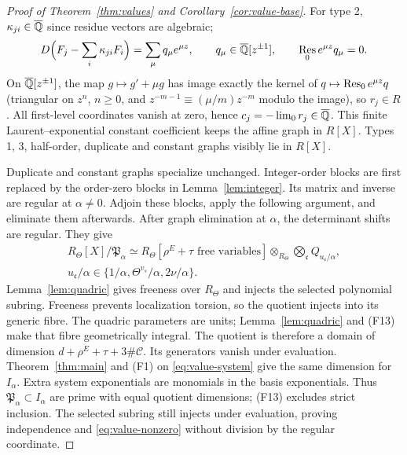 \begin{proof}[Proof of Theorem~\ref{thm:values} and Corollary~\ref{cor:value-base}]
For type 2, $\kappa_{ji}\in{\overline{\mathbb{Q}}}$ since residue vectors are algebraic;
\[
 D\Bigl(F_j-\sum_i\kappa_{ji}F_i\Bigr)
   =\sum_\mu q_\mu e^{\mu z},\qquad
 q_\mu\in{\overline{\mathbb{Q}}}[z^{\pm1}],\qquad
 \operatorname*{Res}_0 e^{\mu z}q_\mu=0.
\]
On ${\overline{\mathbb{Q}}}[z^{\pm1}]$, the map $g\mapsto g'+\mu g$ has image exactly
the kernel of $q\mapsto\operatorname*{Res}_0e^{\mu z}q$ (triangular on $z^n$, $n\ge0$,
and $z^{-m-1}\equiv(\mu/m)z^{-m}$ modulo the image), so $r_j\in R$.
All first-level coordinates vanish at zero, hence
$c_j=-\lim_0r_j\in{\overline{\mathbb{Q}}}$.
This finite Laurent--exponential constant coefficient keeps the affine graph in $R[X]$.
Types 1, 3, half-order, duplicate and constant graphs visibly lie in $R[X]$.

Duplicate and constant graphs specialize unchanged. Integer-order blocks
are first replaced by the order-zero blocks in Lemma~\ref{lem:integer}. Its matrix and inverse are regular at $\alpha\ne0$. Adjoin these blocks,
apply the following argument, and eliminate them afterwards.
After graph elimination at $\alpha$, the determinant shifts are regular.
They give
\begin{equation}\label{eq:specialized-quadric}
\begin{gathered}
R_\Theta[X]/\mathfrak P_\alpha\simeq
R_\Theta[\rho^E+\tau\text{ free variables}]\otimes_{R_\Theta}
\bigotimes_{\mathfrak c}Q_{u_{\mathfrak c}/\alpha},\\
u_{\mathfrak c}/\alpha\in\{1/\alpha,\Theta^{v_s}/\alpha,2\nu/\alpha\}.
\end{gathered}
\end{equation}
Lemma~\ref{lem:quadric} gives freeness over $R_\Theta$ and injects the selected polynomial subring.
Freeness prevents localization torsion, so the quotient injects into its generic fibre.
The quadric parameters are units; Lemma~\ref{lem:quadric} and (F13) make
that fibre geometrically integral. The quotient is therefore a domain of
dimension $d+\rho^E+\tau+3\#\mathcal C$. Its generators vanish under evaluation.
Theorem~\ref{thm:main} and (F1) on \eqref{eq:value-system} give the same dimension for $I_\alpha$.
Extra system exponentials are monomials in the basis exponentials.
Thus $\mathfrak P_\alpha\subset I_\alpha$ are prime with equal quotient
dimensions; (F13) excludes strict inclusion.
The selected subring still injects under evaluation, proving independence
and \eqref{eq:value-nonzero} without division by the regular coordinate.


\end{proof}
